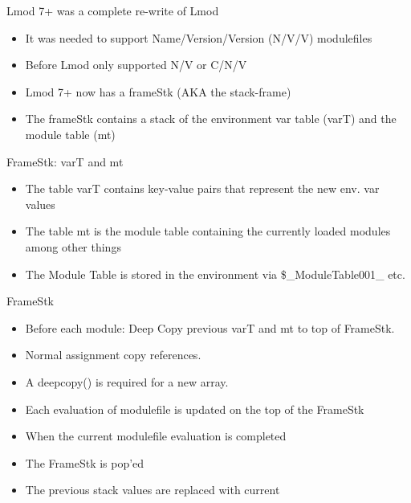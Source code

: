 \documentclass{beamer}
\begin{document}
\begin{frame}{Lmod 7+ was a complete re-write of Lmod}
  \begin{itemize}
    \item It was needed to support Name/Version/Version (N/V/V) modulefiles
    \item Before Lmod only supported N/V or C/N/V
    \item Lmod 7+ now has a frameStk (AKA the stack-frame)
    \item The frameStk contains a stack of the environment var table (varT) and the
      module table (mt)
  \end{itemize}
\end{frame}

\begin{frame}{FrameStk: varT and mt}
  \begin{itemize}
    \item The table varT contains key-value pairs that represent the
      new env. var values
    \item The table mt is the module table containing the currently
      loaded modules among other things
    \item The Module Table is stored in the environment via
      \$\_ModuleTable001\_ etc.
  \end{itemize}
\end{frame}

\begin{frame}{FrameStk}
  \begin{itemize}
    \item Before each module: Deep Copy previous varT and mt to top of
      FrameStk.
    \item Normal assignment copy references.
    \item A deepcopy() is required for a new array.
    \item Each evaluation of modulefile is updated on the top of the
      FrameStk
    \item When the current modulefile evaluation is completed
    \item The FrameStk is pop'ed
    \item The previous stack values are replaced with current
  \end{itemize}
\end{frame}
\end{document}
